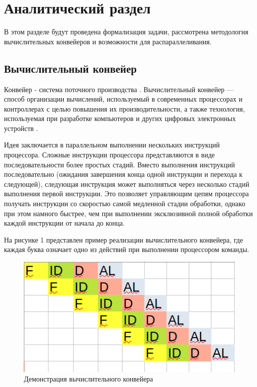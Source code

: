 \chapter{Аналитический раздел}
В этом разделе будут проведена формализация задачи, рассмотрена методология вычислительных конвейеров и возможности для распараллеливания.

\section{Вычислительный конвейер}
Конвейер - система поточного производства \cite{mednov}.
Вычислительный конвейер — способ организации вычислений, используемый в современных процессорах и контроллерах с целью повышения их производительности,
а также технология, используемая при разработке компьютеров и других цифровых электронных устройств \cite{vliw}.

Идея заключается в параллельном выполнении нескольких инструкций процессора. 
Сложные инструкции процессора представляются в виде последовательности более простых стадий. 
Вместо выполнения инструкций последовательно (ожидания завершения конца одной инструкции и перехода к следующей), следующая инструкция может выполняться через несколько стадий выполнения первой инструкции. 
Это позволяет управляющим цепям процессора получать инструкции со скоростью самой медленной стадии обработки, однако при этом намного быстрее, чем при выполнении эксклюзивной полной обработки каждой инструкции от начала до конца.

На рисунке 1 представлен пример реализации вычислительного конвейера, где каждая буква означает одно из действий при выполнении процессором команды.
\FloatBarrier
\begin{figure}[h]
	\begin{center}
		\includegraphics[]{inc/conv.png}
	\end{center}
	\caption{Демонстрация вычислительного конвейера}
\end{figure}
\FloatBarrier

